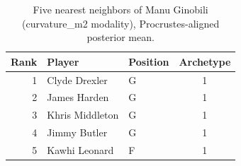 \begin{table}[htbp]
  \centering\small
  \begin{tabular}{rllc}
    \toprule
    Rank & Player & Position & Archetype \\
    \midrule
    1 & Clyde Drexler & G & 1 \\
    2 & James Harden & G & 1 \\
    3 & Khris Middleton & G & 1 \\
    4 & Jimmy Butler & G & 1 \\
    5 & Kawhi Leonard & F & 1 \\
    \bottomrule
  \end{tabular}
  \caption{Five nearest neighbors of Manu Ginobili (curvature_m2 modality), Procrustes-aligned posterior mean.}
  \label{tab:Manu_Ginobili_neighbors_curvature_m2}
\end{table}

